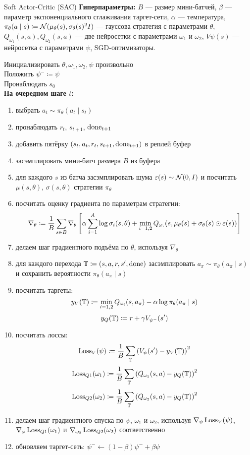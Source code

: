 \begin{algorithm}[label = SACalgorithm]{Soft Actor-Critic (SAC)}
\textbf{Гиперпараметры:} $B$ --- размер мини-батчей, $\beta$ --- параметр экспоненциального сглаживания таргет-сети, $\alpha$ --- температура, $\pi_{\theta}(a \mid s) \coloneqq \mathcal{N}(\mu_{\theta}(s), \sigma_{\theta}(s)^2 I)$ --- гауссова стратегия с параметрами $\theta$, $Q_{\omega_1}(s, a), Q_{\omega_2}(s, a)$ --- две нейросетки с параметрами $\omega_1$ и $\omega_2$, $V\psi(s)$ --- нейросетка с параметрами $\psi$, SGD-оптимизаторы.

\vspace{0.3cm}
Инициализировать $\theta, \omega_1, \omega_2, \psi$ произвольно \\
Положить $\psi^- \coloneqq \psi$ \\
Пронаблюдать $s_0$ \\
\textbf{На очередном шаге $t$:}
\begin{enumerate}
    \item выбрать $a_t \sim \pi_\theta(a_t \mid s_t)$
    \item пронаблюдать $r_t$,  $s_{t+1}$, $\mathrm{done}_{t+1}$
    \item добавить пятёрку $(s_t, a_t, r_t, s_{t+1}, \mathrm{done}_{t+1})$ в реплей буфер
    \item засэмплировать мини-батч размера $B$ из буфера
    \item для каждого $s$ из батча засэмплировать шума $\varepsilon(s) \sim \mathcal{N}(0, I)$ и посчитать $\mu(s, \theta)$, $\sigma(s, \theta)$ стратегии $\pi_\theta$
    \item посчитать оценку градиента по параметрам стратегии:
    $$\nabla_\theta \coloneqq \frac{1}{B}\sum_{s \in B} \nabla_\theta \left[ \alpha \sum_{i=1}^A \log \sigma_i(s, \theta) + \min_{i=1,2} Q_{\omega_i}(s, \mu_\theta(s) + \sigma_\theta(s) \odot \varepsilon(s)) \right]$$
    \item делаем шаг градиентного подъёма по $\theta$, используя $\nabla_\theta$
    \item для каждого перехода $\mathbb{T} \coloneqq (s, a, r, s', \mathrm{done})$ засэмплировать $a_{\pi} \sim \pi_\theta(a_{\pi} \mid s)$ и сохранить вероятности $\pi_\theta(a_\pi \mid s)$
    \item посчитать таргеты:
    $$y_V(\mathbb{T} ) \coloneqq \min_{i = 1, 2} Q_{\omega_i} ( s, a_\pi ) - \alpha \log \pi_\theta(a_\pi \mid s)$$
    $$y_Q(\mathbb{T} ) \coloneqq r + \gamma V_{\psi^{-}}(s')$$
    \item посчитать лоссы:
    $$\operatorname{Loss}_V(\psi) \coloneqq \frac{1}{B}\sum_{\mathbb{T}} \left( V_{\psi}(s') - y_V(\mathbb{T} ) \right) ^2$$
    $$\operatorname{Loss}_{Q1}(\omega_1) \coloneqq \frac{1}{B}\sum_{\mathbb{T}} \left( Q_{\omega_1}(s, a) - y_Q(\mathbb{T} ) \right) ^2$$
    $$\operatorname{Loss}_{Q2}(\omega_2) \coloneqq \frac{1}{B}\sum_{\mathbb{T}} \left( Q_{\omega_2}(s, a) - y_Q(\mathbb{T} ) \right) ^2$$
    \item делаем шаг градиентного спуска по $\psi$, $\omega_1$ и $\omega_2$, используя $\nabla_\psi \operatorname{Loss}_V(\psi)$, $\nabla_\omega \operatorname{Loss}_{Q1}(\omega_1)$ и $\nabla_{\omega_2} \operatorname{Loss}_{Q2}(\omega_2)$ соответственно
    \item обновляем таргет-сеть: $\psi^{-} \leftarrow (1 - \beta) \psi^{-} + \beta \psi$
\end{enumerate}
\end{algorithm}


